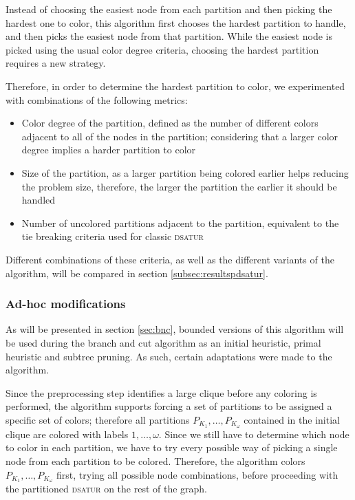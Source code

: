 Instead of choosing the easiest node from each partition and then picking the hardest one to color, this algorithm first chooses the hardest partition to handle, and then picks the easiest node from that partition. While the easiest node is picked using the usual color degree criteria, choosing the hardest partition requires a new strategy. 

Therefore, in order to determine the hardest partition to color, we experimented with combinations of the following metrics:
\begin{itemize}
	\item{Color degree of the partition, defined as the number of different colors adjacent to all of the nodes in the partition; considering that a larger color degree implies a harder partition to color}
	\item{Size of the partition, as a larger partition being colored earlier helps reducing the problem size, therefore, the larger the partition the earlier it should be handled}
	\item{Number of uncolored partitions adjacent to the partition, equivalent to the tie breaking criteria used for classic \textsc{dsatur}} 
\end{itemize}

Different combinations of these criteria, as well as the different variants of the algorithm, will be compared in section \ref{subsec:resultspdsatur}.

\subsubsection{Ad-hoc modifications}

As will be presented in section \ref{sec:bnc}, bounded versions of this algorithm will be used during the branch and cut algorithm as an initial heuristic, primal heuristic and subtree pruning. As such, certain adaptations were made to the algorithm.

Since the preprocessing step identifies a large clique before any coloring is performed, the algorithm supports forcing a set of partitions to be assigned a specific set of colors; therefore all partitions $P_{K_1},\ldots,P_{K_\omega}$ contained in the initial clique are colored with labels $1,\ldots,\omega$. Since we still have to determine which node to color in each partition, we have to try every possible way of picking a single node from each partition to be colored. Therefore, the algorithm colors $P_{K_1},\ldots,P_{K_\omega}$ first, trying all possible node combinations, before proceeding with the partitioned \textsc{dsatur} on the rest of the graph.


